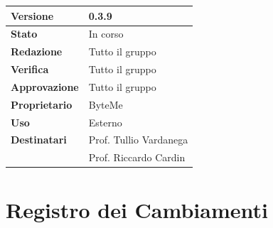 \documentclass[11pt,a4paper]{article}
\begin{document}
\begin{titlepage}
    \begin{table}[H]
        \centering
        \begin{tabular}{|l|p{5cm}|}
            \hline
            \textbf{Versione} & 0.3.9 \\
            \hline
            \textbf{Stato} & In corso \\
            \hline
            \textbf{Redazione} & Tutto il gruppo \\
            \hline
            \textbf{Verifica} & Tutto il gruppo \\
            \hline
            \textbf{Approvazione} & Tutto il gruppo \\
            \hline
            \textbf{Proprietario} & ByteMe \\
            \hline
            \textbf{Uso} & Esterno \\
            \hline
            \textbf{Destinatari} & Prof. Tullio Vardanega \\ & Prof. Riccardo Cardin \\
            \hline
        \end{tabular}
    \end{table}
    
    \vfill
\end{titlepage}

\thispagestyle{empty}
\section*{Registro dei Cambiamenti}
\end{document}
